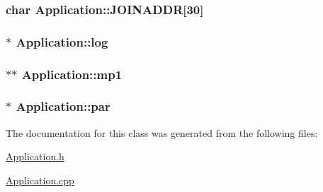 \subsubsection[{J\+O\+I\+N\+A\+D\+D\+R}]{\setlength{\rightskip}{0pt plus 5cm}char Application\+::\+J\+O\+I\+N\+A\+D\+D\+R\mbox{[}30\mbox{]}\hspace{0.3cm}{\ttfamily [private]}}\label{class_application_acca96da4be60c3bc3018337cc6233e46}
\hypertarget{class_application_a92d6f9eb17704ca7a7d28862faa4cbd0}{}
\subsubsection[{log}]{$\ast$ Application\+::log\hspace{0.3cm}{\ttfamily [private]}}\label{class_application_a92d6f9eb17704ca7a7d28862faa4cbd0}
\hypertarget{class_application_a858c988b6be86ab4d6d41b044d15ef1a}{}
\subsubsection[{mp1}]{$\ast$$\ast$ Application\+::mp1\hspace{0.3cm}{\ttfamily [private]}}\label{class_application_a858c988b6be86ab4d6d41b044d15ef1a}
\hypertarget{class_application_aca640b0742d1f5325a031584a9224a00}{}
\subsubsection[{par}]{$\ast$ Application\+::par\hspace{0.3cm}{\ttfamily [private]}}\label{class_application_aca640b0742d1f5325a031584a9224a00}


The documentation for this class was generated from the following files\+:\begin{DoxyCompactItemize}
\item 
\hyperlink{_application_8h}{Application.\+h}\item 
\hyperlink{_application_8cpp}{Application.\+cpp}\end{DoxyCompactItemize}

